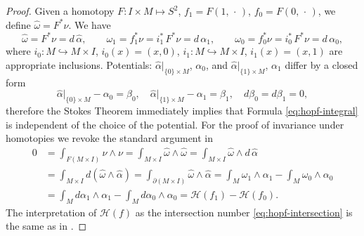 \documentclass[12pt]{article}
\numberwithin{equation}{section}
\newcommand{\no}{\noindent}
\begin{document}
\begin{proof}
\no Given a homotopy $F:I\times M\mapsto
S^2$, $f_1=F(1,\,\cdot\,)$, $f_0=F(0,\,\cdot\,)$, we define
$\hat{\omega}=F^\ast\nu$. We have 
\[
\hat{\omega}  = F^\ast\nu=d\,\hat{\alpha},\qquad 
\omega_1  =  f_1^\ast\nu=i^\ast_1\,F^\ast\nu=d\,\alpha_1,\qquad 
\omega_0  =  f_0^\ast\nu=i^\ast_0\,F^\ast\nu=d\,\alpha_0,
\]
where $i_0:M\hookrightarrow M\times I$, $i_0(x)=(x,0)$, $i_1:M\hookrightarrow M\times I$, $i_1(x)=(x,1)$
are appropriate inclusions. Potentials: $\hat{\alpha}\bigl|_{\{0\}\times M}$, $\alpha_0$, and $\hat{\alpha}\bigl|_{\{1\}\times M}$, $\alpha_1$ differ  by a closed form 
\[
\hat{\alpha}\bigl|_{\{0\}\times M}-\alpha_0=\beta_0,\quad \hat{\alpha}\bigl|_{\{1\}\times M}-\alpha_1=\beta_1,\quad d\beta_0=d\beta_1=0,
\]
therefore the Stokes Theorem immediately implies that Formula \eqref{eq:hopf-integral} is independent of the choice 
of the potential. For the proof of invariance under homotopies we revoke the standard argument in \cite[p. 228]{Bott82}
\[
\begin{split}
 0 & = \int_{F(M\times I)} \nu\wedge\nu
 =\int_{M\times I} \hat{\omega}\wedge \hat{\omega} =  \int_{M\times I} \hat{\omega}\wedge d\,\hat{\alpha}\\
 & = \int_{M\times I} d(\hat{\omega}\wedge \hat{\alpha}) = \int_{\partial(M\times I)} \hat{\omega}\wedge
\hat{\alpha}  =  \int_{M} \omega_1\wedge \alpha_1- \int_{M}
\omega_0\wedge \alpha_0\\
& =  \int_{M} d\alpha_1 \wedge \alpha_1-\int_{M}
d\alpha_0\wedge \alpha_0 =  \mathscr{H}(f_1)-\mathscr{H}(f_0).
\end{split}
\]
\no The interpretation of $\mathscr{H}(f)$ as the intersection number \eqref{eq:hopf-intersection} is the same as in \cite[p. 230]{Bott82}.
\end{proof}
\end{document}
